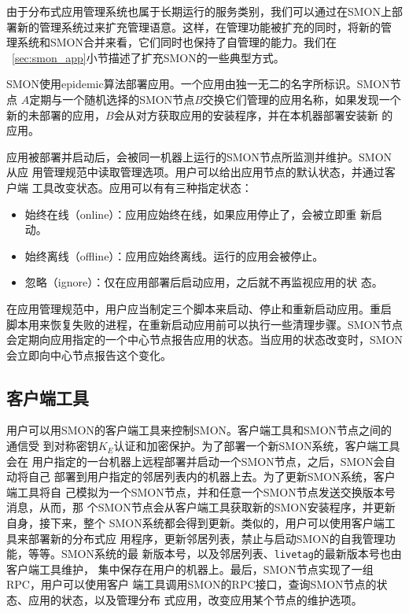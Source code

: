 由于分布式应用管理系统也属于长期运行的服务类别，我们可以通过在SMON上部
署新的管理系统过来扩充管理语意。这样，在管理功能被扩充的同时，将新的管
理系统和SMON合并来看，它们同时也保持了自管理的能力。我们在
~\ref{sec:smon_app}小节描述了扩充SMON的一些典型方式。

SMON使用epidemic算法部署应用。一个应用由独一无二的名字所标识。SMON节点
$A$定期与一个随机选择的SMON节点$B$交换它们管理的应用名称，如果发现一个
新的未部署的应用，$B$会从对方获取应用的安装程序，并在本机器部署安装新
的应用。

应用被部署并启动后，会被同一机器上运行的SMON节点所监测并维护。SMON从应
用管理规范中读取管理选项。用户可以给出应用节点的默认状态，并通过客户端
工具改变状态。应用可以有有三种指定状态：

\begin{itemize}
  \item 始终在线（online）：应用应始终在线，如果应用停止了，会被立即重
  新启动。

  \item 始终离线（offline）：应用应始终离线。运行的应用会被停止。

  \item 忽略（ignore）：仅在应用部署后启动应用，之后就不再监视应用的状
  态。
\end{itemize}

在应用管理规范中，用户应当制定三个脚本来启动、停止和重新启动应用。重启
脚本用来恢复失败的进程，在重新启动应用前可以执行一些清理步骤。SMON节点
会定期向应用指定的一个中心节点报告应用的状态。当应用的状态改变时，SMON
会立即向中心节点报告这个变化。

%


\subsection{客户端工具}
\label{subsec:client}

用户可以用SMON的客户端工具来控制SMON。客户端工具和SMON节点之间的通信受
到对称密钥$K_E$认证和加密保护。为了部署一个新SMON系统，客户端工具会在
用户指定的一台机器上远程部署并启动一个SMON节点，之后，SMON会自动将自己
部署到用户指定的邻居列表内的机器上去。为了更新SMON系统，客户端工具将自
己模拟为一个SMON节点，并和任意一个SMON节点发送交换版本号消息，从而，那
个SMON节点会从客户端工具获取新的SMON安装程序，并更新自身，接下来，整个
SMON系统都会得到更新。类似的，用户可以使用客户端工具来部署新的分布式应
用程序，更新邻居列表，禁止与启动SMON的自我管理功能，等等。SMON系统的最
新版本号，以及邻居列表、\texttt{livetag}的最新版本号也由客户端工具维护，
集中保存在用户的机器上。最后，SMON节点实现了一组RPC，用户可以使用客户
端工具调用SMON的RPC接口，查询SMON节点的状态、应用的状态，以及管理分布
式应用，改变应用某个节点的维护选项。

